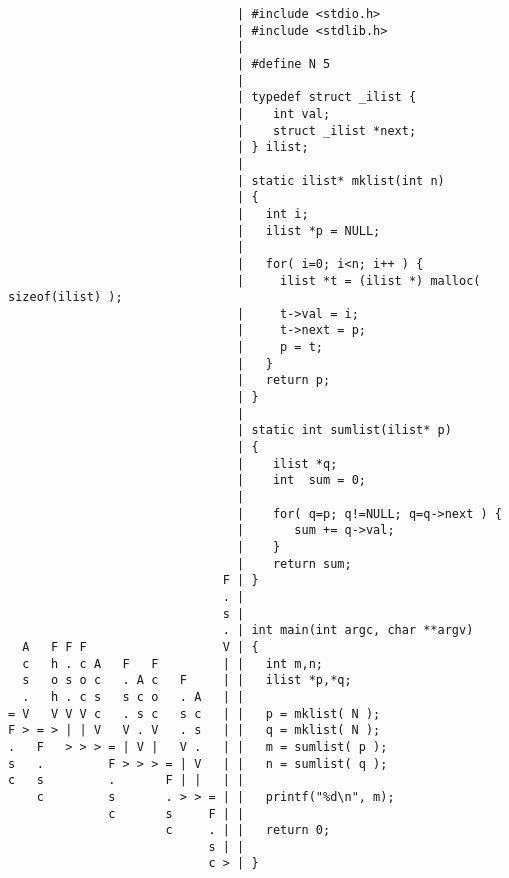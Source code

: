 \begin{verbatim}
                                | #include <stdio.h>
                                | #include <stdlib.h>
                                | 
                                | #define N 5
                                | 
                                | typedef struct _ilist {
                                |    int val;
                                |    struct _ilist *next;
                                | } ilist;
                                | 
                                | static ilist* mklist(int n)
                                | {
                                |   int i;
                                |   ilist *p = NULL;
                                | 
                                |   for( i=0; i<n; i++ ) {
                                |     ilist *t = (ilist *) malloc( sizeof(ilist) );
                                |     t->val = i;
                                |     t->next = p;
                                |     p = t;
                                |   }
                                |   return p;
                                | }
                                | 
                                | static int sumlist(ilist* p)
                                | {
                                |    ilist *q;
                                |    int  sum = 0;
                                | 
                                |    for( q=p; q!=NULL; q=q->next ) {
                                |       sum += q->val;
                                |    }
                                |    return sum;
                              F | }
                              . | 
                              s | 
                              . | int main(int argc, char **argv) 
  A   F F F                   V | {
  c   h . c A   F   F         | |   int m,n;
  s   o s o c   . A c   F     | |   ilist *p,*q;
  .   h . c s   s c o   . A   | | 
= V   V V V c   . s c   s c   | |   p = mklist( N );
F > = > | | V   V . V   . s   | |   q = mklist( N );
.   F   > > > = | V |   V .   | |   m = sumlist( p );
s   .         F > > > = | V   | |   n = sumlist( q );
c   s         .       F | |   | | 
    c         s       . > > = | |   printf("%d\n", m);
              c       s     F | | 
                      c     . | |   return 0;
                            s | | 
                            c > | }
\end{verbatim}

